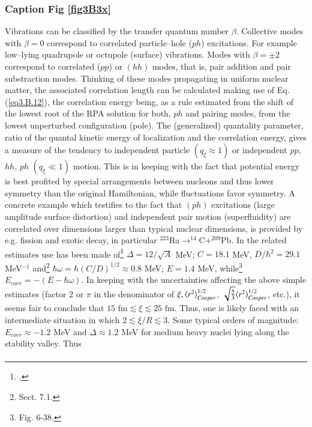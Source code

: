 \begin{subappendices}
         \subsubsection{Caption Fig \ref{fig3B3x}}
         Vibrations can be classified by the transfer quantum number $\beta$. Collective modes with $\beta=0$ correspond to correlated particle--hole ($ph$) excitations. For example low--lying quadrupole or octupole (surface)  vibrations. Modes with  $\beta=\pm2$  correspond to correlated ($pp$) or $(hh)$ modes, that is, pair addition and pair substraction modes.
         Thinking of these modes propagating in uniform nuclear matter, the associated correlation length can be calculated making use of Eq. (\ref{eq3.B.12}), the correlation energy being, as a rule estimated from the shift of the lowest root of the RPA solution for both, $ph$ and pairing modes, from the lowest unperturbed configuration (pole). The (generalized) quantality parameter, ratio of the quantal kinetic energy of localization and the correlation energy,  gives a measure of the tendency to independent particle $(q_\xi\approx1)$ or independent $pp$, $hh$, $ph$ $(q_\xi\ll1)$ motion. This is in keeping with the fact that potential energy is best profited by special arrangements between nucleons and thus lower symmetry than the original Hamiltonian, while fluctuations favor symmetry. A concrete example which testifies to the fact that $(ph)$ excitations (large amplitude surface distortion) and independent pair motion (superfluidity) are correlated over dimensions larger than typical nuclear dimensions, is provided by e.g. fission and exotic decay, in particular $^{223}$Ra$\rightarrow^{14}$C$+^{209}$Pb. In the related estimates use has been made of\footnote{\cite{Bohr:69}.} $\Delta=12/\sqrt{A}$ MeV; $C=18.1$ MeV, $D/\hbar^2=29.1$ MeV$^{-1}$ and\footnote{\cite{Brink:05} Sect. 7.1.} $\hbar\omega=\hbar(C/D)^{1/2}\approx0.8$ MeV; $E=1.4$ MeV, while\footnote{\cite{Bohr:75} Fig. 6-38.} $E_{corr}=-(E-\hbar\omega)$. In keeping with the uncertainties affecting the above simple estimates (factor 2 or $\pi$ in the denominator of $\xi,\langle {r^2} \rangle^{1/2}_{Cooper}$,  $\sqrt{\frac{5}{3}}\langle {r^2} \rangle^{1/2}_{Cooper}$, etc.), it seems fair to conclude that $15\text{ fm}\lesssim\xi\lesssim25\text{ fm}$. Thus, one is likely faced with an intermediate situation in which $2\lesssim\xi/R\lesssim3.$
         \newpage
 Some typical orders of magnitude: $E_{corr}\approx -1.2 $ MeV and $\Delta\approx 1.2$ MeV for medium heavy nuclei lying along the stability valley. Thus
 \begin{align}

\end{align}
\end{subappendices}

